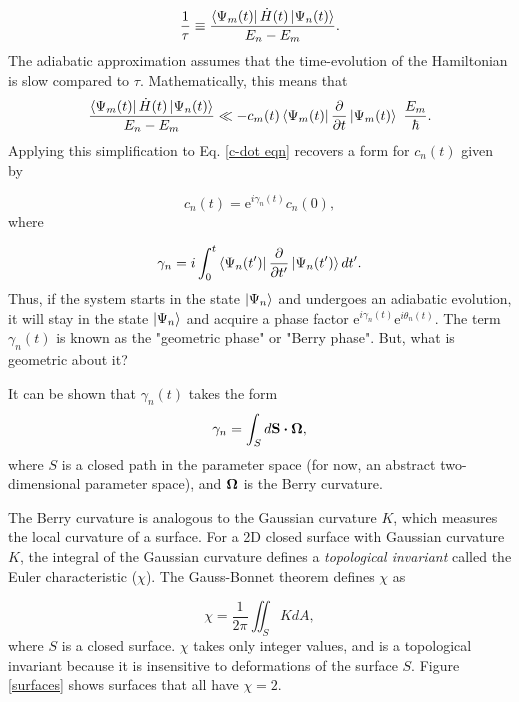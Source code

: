 \documentclass[double,12pt,1in]{beavtex}
\begin{document}
\begin{equation}
    \frac{1}{\tau} \equiv \frac{\bra{\Psi_m(t)}\dot{H}(t)\ket{\Psi_n(t)}}{E_n - E_m}.
\end{equation}
The adiabatic approximation assumes that the time-evolution of the Hamiltonian is slow compared to $\tau$. Mathematically, this means that
\begin{equation}
    \frac{\bra{\Psi_m(t)}\dot{H}(t)\ket{\Psi_n(t)}}{E_n - E_m} \ll - c_m(t) \bra{\Psi_m(t)}\pdv{t}\ket{\Psi_m(t)} ~ \frac{E_m}{\hbar}.
\end{equation}
Applying this simplification to Eq. \ref{c-dot eqn} recovers a form for $c_n(t)$ given by

\begin{equation}
    c_n(t) = \mathrm{e}^{i \gamma_n(t)}c_n(0),
\end{equation}
where 

\begin{equation}
    \gamma_n = i \int_{0}^{t} \bra{\Psi_n(t')}\pdv{t'}\ket{\Psi_n(t')} dt'. \label{geometric phase}
\end{equation}
Thus, if the system starts in the state $\ket{\Psi_n}$ and undergoes an adiabatic evolution, it will stay in the state $\ket{\Psi_n}$ and acquire a phase factor $\mathrm{e}^{i \gamma_n(t)} \mathrm{e}^{i \theta_n(t)}$. The term $\gamma_n(t)$ is known as the "geometric phase" or "Berry phase". But, what is geometric about it? 

It can be shown that $\gamma_n(t)$ takes the form \cite[p. 349-351]{sakurai_modern_1985}
\begin{equation}
    \gamma_n = \int_{S} d\vectorbold{S}\dotproduct \vectorbold{\Omega},
\end{equation}
where $S$ is a closed path in the parameter space (for now, an abstract two-dimensional parameter space), and $\vectorbold{\Omega}$ is the Berry curvature. 

The Berry curvature is analogous to the Gaussian curvature $K$, which measures the local curvature of a surface. For a 2D closed surface with Gaussian curvature $K$, the integral of the Gaussian curvature defines a \textit{topological invariant} called the Euler characteristic ($\chi$). The Gauss-Bonnet theorem defines $\chi$ as

\begin{equation}
    \chi = \frac{1}{2\pi}\iint_S K dA,
\end{equation}
where $S$ is a closed surface. $\chi$ takes only integer values, and is a topological invariant because it is insensitive to deformations of the surface $S$. Figure \ref{surfaces} shows surfaces that all have $\chi = 2$.
\end{document}
